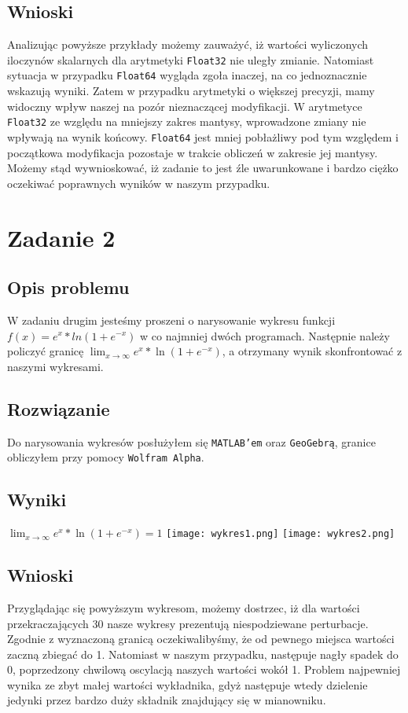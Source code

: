 \documentclass{article}
\begin{document}
\begin{center}
    \subsection{Wnioski}
    \large Analizując powyższe przykłady możemy zauważyć, iż wartości wyliczonych iloczynów skalarnych dla arytmetyki 
     \texttt{Float32} nie uległy zmianie. Natomiast sytuacja w przypadku \texttt{Float64} wygląda zgoła inaczej, na co jednoznacznie wskazują wyniki.
      Zatem w przypadku arytmetyki o większej precyzji, mamy widoczny wpływ naszej na pozór nieznaczącej modyfikacji.
      W arytmetyce \texttt{Float32} ze względu na mniejszy zakres mantysy, wprowadzone zmiany nie wpływają na wynik końcowy.
      \texttt{Float64} jest mniej pobłażliwy pod tym względem i początkowa modyfikacja pozostaje w trakcie obliczeń w zakresie jej mantysy.
      Możemy stąd wywnioskować, iż zadanie to jest źle uwarunkowane i bardzo ciężko oczekiwać poprawnych wyników w naszym przypadku.

    \section{Zadanie 2}
    \subsection{Opis problemu}
    \large W zadaniu drugim jesteśmy proszeni o narysowanie wykresu funkcji \(f(x) = e^x*ln(1 + e^{-x})\) w co najmniej dwóch programach.
     Następnie należy policzyć granicę \(\lim_{x \to \infty} e^x*\ln(1 + e^{-x})\), a otrzymany wynik skonfrontować z naszymi wykresami.
    \subsection{Rozwiązanie}
    \large Do narysowania wykresów posłużyłem się \texttt{MATLAB'em} oraz \texttt{GeoGebrą}, granice obliczyłem przy pomocy \texttt{Wolfram Alpha}.
    \subsection{Wyniki}
    \(\lim_{x \to \infty} e^x*\ln(1 + e^{-x}) = 1\)
    \texttt{[image: wykres1.png]}
    \texttt{[image: wykres2.png]}
    \subsection{Wnioski}
    \large Przyglądając się powyższym wykresom, możemy dostrzec, iż dla wartości przekraczających 30 nasze wykresy prezentują niespodziewane perturbacje.
     Zgodnie z wyznaczoną granicą oczekiwalibyśmy, że od pewnego miejsca wartości zaczną zbiegać do 1. Natomiast w naszym przypadku, następuje nagły spadek do 0,
     poprzedzony chwilową oscylacją naszych wartości wokół 1. Problem najpewniej wynika ze zbyt małej wartości wykładnika, gdyż następuje wtedy dzielenie jedynki przez bardzo duży składnik znajdujący się w mianowniku.


\end{center}
\end{document}
